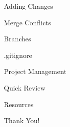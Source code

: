 \documentclass{beamer}
\begin{document}
    \begin{frame}{Adding Changes}
    \end{frame}

    \begin{frame}{Merge Conflicts}
    \end{frame}

    \begin{frame}{Branches}
    \end{frame}

    \begin{frame}{.gitignore}
    \end{frame}

    \begin{frame}{Project Management}
    \end{frame}

    \begin{frame}{Quick Review}
    \end{frame}

    \begin{frame}{Resources}
    \end{frame}

    \begin{frame}{Thank You!}
    \end{frame}
\end{document}

